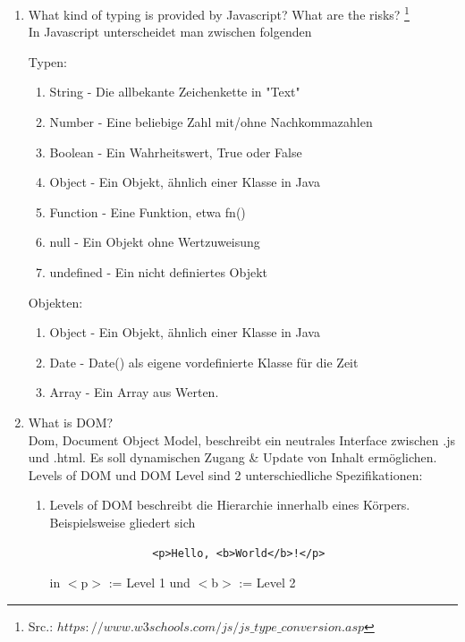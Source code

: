 \documentclass[11pt]{article}
\begin{document}
\begin{enumerate}[\thesection .1]
        \item What kind of typing is provided by Javascript? What are the risks? \footnote[2]{Src.: $https://www.w3schools.com/js/js\_type\_conversion.asp$}\\
        In Javascript unterscheidet man zwischen folgenden
        \begin{addmargin}[1em]{1em}
            Typen:
            \begin{enumerate}[$\circ$]
                \item String - Die allbekante Zeichenkette in "Text"
                \item Number - Eine beliebige Zahl mit/ohne Nachkommazahlen
                \item Boolean - Ein Wahrheitswert, True oder False
                \item Object - Ein Objekt, ähnlich einer Klasse in Java
                \item Function - Eine Funktion, etwa fn(){}
                \item null - Ein Objekt ohne Wertzuweisung
                \item undefined - Ein nicht definiertes Objekt
            \end{enumerate}

            Objekten:
            \begin{enumerate}[$\circ$]
                \item Object - Ein Objekt, ähnlich einer Klasse in Java
                \item Date - Date() als eigene vordefinierte Klasse für die Zeit
                \item Array - Ein Array aus Werten.
            \end{enumerate}
        \end{addmargin}

        \item What is DOM?\\
        Dom, Document Object Model, beschreibt ein neutrales Interface zwischen .js und .html.
        Es soll dynamischen Zugang \& Update von Inhalt ermöglichen.
        Levels of DOM und DOM Level sind 2 unterschiedliche Spezifikationen:
        \begin{enumerate}[$\diamond$]
            \item Levels of DOM beschreibt die Hierarchie innerhalb eines Körpers. Beispielsweise gliedert sich
            \begin{verbatim}
                <p>Hello, <b>World</b>!</p>
            \end{verbatim}
            in $<$p$>$ := Level 1 und $<$b$>$ := Level 2


\end{enumerate}
\end{enumerate}
\end{document}
